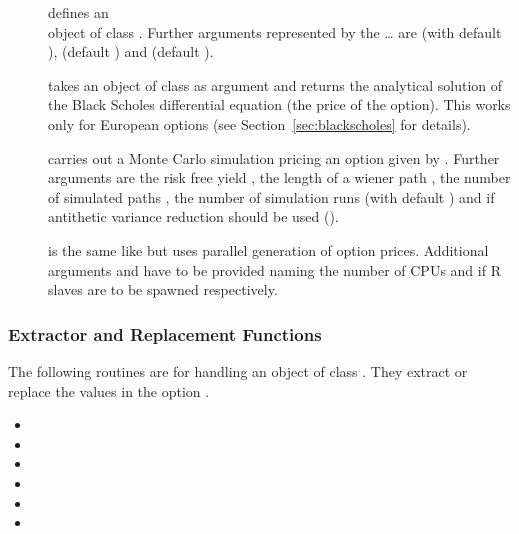 \begin{description}
\item[]
  defines an \\object of class . Further arguments
  represented by the \ldots{} are  (with default
  ),  (default ) and
   (default ).
\item[] takes an object of class
   as argument and returns the analytical solution of
  the Black Scholes differential equation (the price of the
  option). This works only for European options (see
  Section~\ref{sec:blackscholes} for details).
\item[] carries out a
  Monte Carlo simulation pricing 
  an option given by . Further arguments are the risk free
  yield , the length of a wiener path , the number of
  simulated paths , the number of simulation runs
   (with default ) and if antithetic
  variance reduction should be used ().
\item[] is the same
  like  but uses parallel generation of
  option prices. Additional arguments  and
   have to be provided naming the number of CPUs
  and if R slaves are to be spawned respectively.
\end{description}

\subsubsection{Extractor and Replacement Functions}

The following routines are for handling an object of class
. They
extract or replace the values in the option .

\begin{itemize}
\item {}
\item {}
\item {}
\item {}
\item {}
\item {}
\end{itemize}

